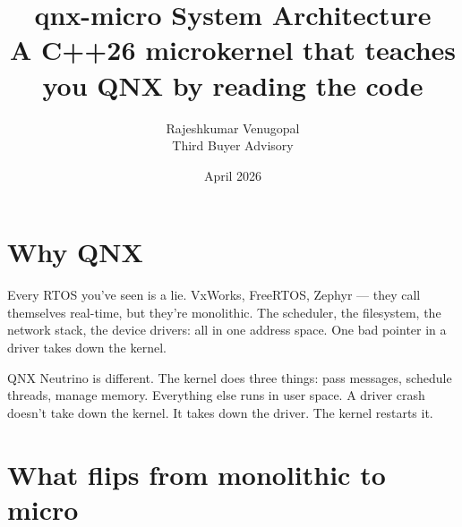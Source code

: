 \documentclass[11pt]{article}
\title{\textbf{qnx-micro System Architecture}\\
  \large A C++26 microkernel that teaches you QNX by reading the code}
\author{Rajeshkumar Venugopal\\Third Buyer Advisory}
\date{April 2026}
\begin{document}
\maketitle

\section{Why QNX}

Every RTOS you've seen is a lie.  VxWorks, FreeRTOS, Zephyr ---
they call themselves real-time, but they're monolithic.  The
scheduler, the filesystem, the network stack, the device
drivers: all in one address space.  One bad pointer in a driver
takes down the kernel.

QNX Neutrino is different.  The kernel does three things:
pass messages, schedule threads, manage memory.  Everything
else runs in user space.  A driver crash doesn't take down
the kernel.  It takes down the driver.  The kernel restarts it.

\section{What flips from monolithic to micro}
\end{document}
